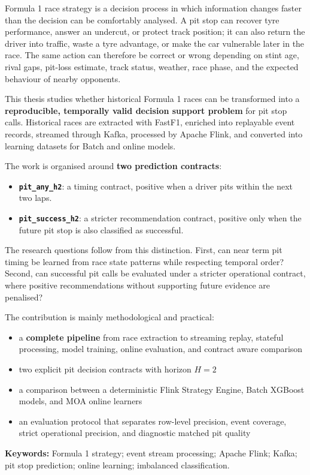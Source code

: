 Formula 1 race strategy is a decision process in which information changes faster than the decision can be comfortably analysed. A pit 
stop can recover tyre performance, answer an undercut, or protect track position; it can also return the driver into traffic, waste a 
tyre advantage, or make the car vulnerable later in the race. The same action can therefore be correct or wrong depending on stint age, 
rival gaps, pit-loss estimate, track status, weather, race phase, and the expected behaviour of nearby opponents.

This thesis studies whether historical Formula 1 races can be transformed into a \textbf{reproducible, temporally valid decision support problem} 
for pit stop calls. Historical races are extracted with FastF1, enriched into replayable event records, streamed through Kafka, processed by 
Apache Flink, and converted into learning datasets for Batch and online models.

The work is organised around \textbf{two prediction contracts}:
\begin{itemize}
    \item \textbf{\texttt{pit\_any\_h2}}: a timing contract, positive when a driver pits within the next two laps.
    \item \textbf{\texttt{pit\_success\_h2}}: a stricter recommendation contract, positive only when the future pit stop is also classified as successful.
\end{itemize}

The research questions follow from this distinction. First, can near term pit timing be learned from race state patterns while respecting 
temporal order? Second, can successful pit calls be evaluated under a stricter operational contract, where positive recommendations without 
supporting future evidence are penalised?

The contribution is mainly methodological and practical:
\begin{itemize}
    \item a \textbf{complete pipeline} from race extraction to streaming replay, stateful processing, model training, online evaluation, and 
    contract aware comparison
    \item two explicit pit decision contracts with horizon $H=2$
    \item a comparison between a deterministic Flink Strategy Engine, Batch XGBoost models, and MOA online learners
    \item an evaluation protocol that separates row-level precision, event coverage, strict operational precision, and diagnostic matched pit quality
\end{itemize}

\textbf{Keywords:} Formula 1 strategy; event stream processing; Apache Flink; Kafka; pit stop prediction; online learning; imbalanced classification.
